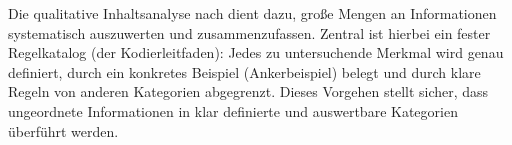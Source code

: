 \noindent Die qualitative Inhaltsanalyse nach \cite{mayring:qualitative2015} dient dazu, große Mengen an Informationen systematisch auszuwerten und zusammenzufassen. Zentral ist hierbei ein fester Regelkatalog (der Kodierleitfaden): Jedes zu untersuchende Merkmal wird genau definiert, durch ein konkretes Beispiel (Ankerbeispiel) belegt und durch klare Regeln von anderen Kategorien abgegrenzt. Dieses Vorgehen stellt sicher, dass ungeordnete Informationen in klar definierte und auswertbare Kategorien überführt werden.